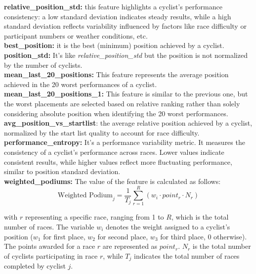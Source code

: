 \noindent
\textbf{relative\_position\_std:} this feature highlights a cyclist's performance consistency: a low standard deviation indicates steady results, while a high standard deviation reflects variability influenced by factors like race difficulty or participant numbers or weather conditions, etc.\\

\noindent
\textbf{best\_position:} it is the best (minimum) position achieved by a cyclist.\\

\noindent
\textbf{position\_std:} It's like \textit{relative\_position\_std} but the position is not normalized by the number of cyclists.\\

\noindent
\textbf{mean\_last\_20\_positions:} This feature represents the average position achieved in the 20 worst performances of a cyclist.\\

\noindent
\textbf{mean\_last\_20\_positions\_1:} This feature is similar to the previous one, but the worst placements are selected based on relative ranking rather than solely considering absolute position when identifying the 20 worst performances. \\

\noindent
\textbf{avg\_position\_vs\_startlist}: the average relative position achieved by a cyclist, normalized by the start list quality to account for race difficulty.\\

\noindent
\textbf{performance\_entropy:} It's a performance variability metric. It measures the consistency of a cyclist's performance across races. Lower values indicate consistent results, while higher values reflect more fluctuating performance, similar to position standard deviation.\\

\noindent
\textbf{weighted\_podiums:} 
The value of the feature is calculated as follows:
\[
\text{Weighted Podium}_{j} =  \frac{1}{T_j}  \sum_{r=1}^{R} \left( w_i \cdot point_{r} \cdot N_r \right)
\]

\noindent
with \( r \) representing a specific race, ranging from 1 to \( R \), which is the total number of races. The variable \( w_i \) denotes the weight assigned to a cyclist's position ($w_1$ for first place, $w_2$ for second place, $w_3$ for third place, 0 otherwise). The points awarded for a race \( r \) are represented as \( point_r \). \( N_r \) is the total number of cyclists participating in race \( r \), while \( T_j \) indicates the total number of races completed by cyclist \( j \).\\


